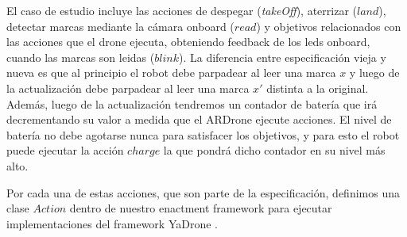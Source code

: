 El caso de estudio incluye las acciones de despegar (\emph{takeOff}), aterrizar ($land$), detectar marcas mediante la cámara
onboard ($read$) y objetivos relacionados con las acciones que el drone ejecuta, obteniendo feedback de los leds
onboard, cuando las marcas son leidas ($blink$). La diferencia entre especificación vieja y nueva es que al principio el
robot debe parpadear al leer una marca $x$ y luego de la actualización debe parpadear al leer una marca $x'$ distinta a
la original. Además, luego de la actualización tendremos un contador de batería que irá decrementando su valor a medida
que el ARDrone ejecute acciones. El nivel de batería no debe agotarse nunca para satisfacer los objetivos, y para esto
el robot puede ejecutar la acción $charge$ la que pondrá dicho contador en su nivel más alto.

Por cada una de estas acciones, que son parte de la especificación, definimos una clase $Action$ dentro de nuestro
enactment framework para ejecutar implementaciones del framework YaDrone \cite{YaDrone}.



